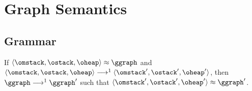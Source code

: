 \documentclass{article}
\begin{document}
\begin{definition}
\begin{multicols}{2}
          \end{multicols}
      \end{definition}


    \section{Graph Semantics}

      \subsection{Grammar}

      \begin{grammar}
        \grule[graph]{\ggraph}{ \{\gedge, \ldots\} }
        \grule[edges]{\gedge}{
                    \gnode \gsBefore \gnode
            \gor    \gnode \gsSkip \gnode
        }
        \grule[nodes]{\gnode}{
                    \gsstart
            \gor    \gsend
            \gor    \gsLR{\olbl, \omstack, \gtime}
            \gor    \gsLR{\genter \olbl, \gtime}
            \gor    \gsLR{\gleave \olbl, \gtime}
        }

      \end{grammar}

      \begin{theorem}[Bisimulation]
        If $\osLR{\omstack, \ostack, \oheap} \approx \ggraph$ and $\osLR{\omstack, \ostack, \oheap} \osTransition \osLR{\omstack', \ostack', \oheap'}$, then $\ggraph \gsTransition \ggraph'$ such that $\osLR{\omstack', \ostack', \oheap'} \approx \ggraph'$.
      \end{theorem}
\end{document}
